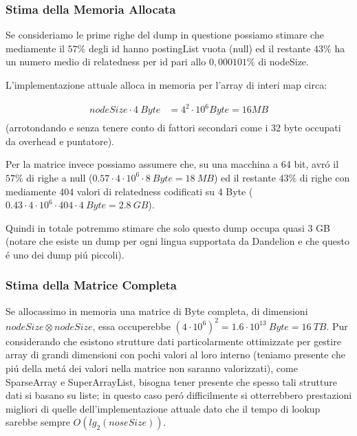 \subsubsection{Stima della Memoria Allocata}
Se consideriamo le prime righe del dump in questione possiamo stimare che mediamente il $57\%$ degli id hanno postingList vuota (null) ed il restante $43\%$ ha un numero 
medio di relatedness per id pari allo $0,000101\%$ di nodeSize.

L'implementazione attuale alloca in memoria per l'array di interi map circa:
\begin{center}
\begin{equation}\begin{split} 
    nodeSize \cdot 4\ Byte & = 4^2 \cdot 10^6 Byte = 16 MB \\
\end{split}\end{equation}
(arrotondando e senza tenere conto di fattori secondari come i 32 byte occupati da overhead e puntatore).
\end{center}
Per la matrice invece possiamo assumere che, su una macchina a 64 bit, avr\'o il $57\%$ di righe a null ($0.57 \cdot 4\cdot 10^6 \cdot 8\ Byte = 18\ MB$) ed il 
restante $43\%$ di righe con mediamente 404 valori di relatedness codificati su 4 Byte ($0.43 \cdot 4 \cdot 10^6 \cdot 404 \cdot 4\ Byte = 2.8\ GB$). 

Quindi in totale potremmo stimare che solo questo dump occupa quasi 3 GB (notare che esiste un dump per ogni lingua supportata da Dandelion e che questo \'e uno 
dei dump pi\'u piccoli).

\subsubsection{Stima della Matrice Completa}
Se allocassimo in memoria una matrice di Byte completa, di dimensioni $nodeSize \otimes nodeSize$, essa occuperebbe $(4 \cdot 10^6)^2 = 1.6 \cdot 10^{13}\ Byte = 16\ TB$.
Pur considerando che esistono strutture dati particolarmente ottimizzate per gestire array di grandi dimensioni con pochi valori al loro interno (teniamo presente che
pi\'u della met\'a dei valori nella matrice non saranno valorizzati), come SparseArray e SuperArrayList, bisogna tener presente che spesso tali strutture dati 
si basano su liste; in questo caso per\'o difficilmente si otterrebbero prestazioni migliori di quelle dell'implementazione attuale dato che il tempo di lookup 
sarebbe sempre $O(lg_2(noseSize))$. 

